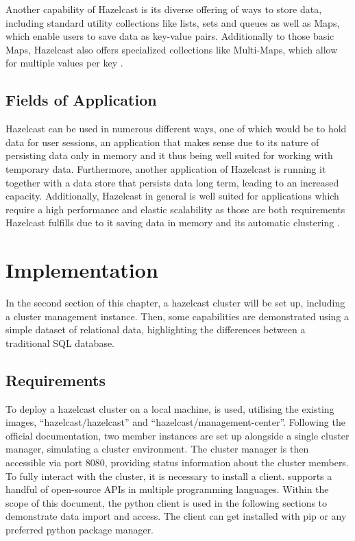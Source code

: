 Another capability of Hazelcast is its diverse offering of ways to store data, including standard utility collections like lists, sets and queues as well as Maps, which enable users to save data as key-value pairs. Additionally to those basic Maps, Hazelcast also offers  
specialized collections like Multi-Maps, which allow for multiple values per key \parencite{Johns.2015}.
\subsection{Fields of Application} \label{subsec:fieldsOfApplicationHazelcast}

Hazelcast can be used in numerous different ways, one of which would be to hold data for user sessions, an application that makes sense due to its nature 
of persisting data only in memory and it thus being well suited for working with temporary data. Furthermore, another application of Hazelcast is 
running it together with a data store that persists data long term, leading to an increased capacity. Additionally, Hazelcast in general is well 
suited for applications which require a high performance and elastic scalability as those are both requirements Hazelcast fulfills due to it saving data in memory and 
its automatic clustering \parencite{Johns.2015}. 


\section{Implementation} \label{sec:implementationHazelcast}

In the second section of this chapter, a hazelcast cluster will be set up, including a cluster management 
instance. Then, some capabilities are demonstrated using a simple dataset of relational data, highlighting 
the differences between a traditional SQL database.

\subsection{Requirements} \label{subsec:requirementsHazelcast}

To deploy a hazelcast cluster on a local machine, \textcite{Hazelcast.Docker.Hazelcast, Hazelcast.Docker.ManagementCenter} is used, utilising the existing images, 
\enquote{hazelcast/hazelcast}  and \enquote{hazelcast/management-center}. 
Following the official documentation, two member instances are set up alongside a single cluster manager, 
simulating a cluster environment. The cluster manager is then accessible via port 8080, providing status 
information about the cluster members. To fully interact with the cluster, it is necessary to install a 
client. \textcite{Hazelcast.Clients} supports a handful of open-source APIs in multiple programming languages. 
Within the scope of this document, the python client is 
used in the following sections to demonstrate data import and access. The client can get installed with pip 
or any preferred python package manager.

